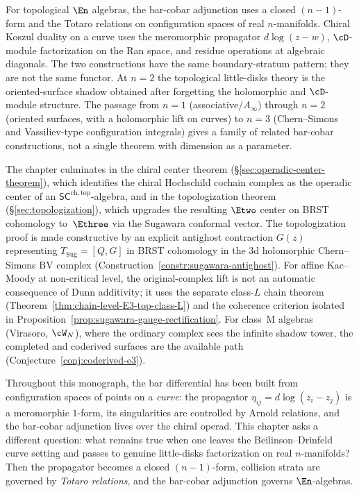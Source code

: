 For topological $\En$ algebras, the bar-cobar adjunction uses a
closed $(n{-}1)$-form and the Totaro relations on
configuration spaces of real $n$-manifolds. Chiral Koszul duality on
a curve uses the meromorphic propagator $d\log(z-w)$, $\cD$-module
factorization on the Ran space, and residue operations at algebraic
diagonals. The two constructions have the same boundary-stratum
pattern; they are not the same functor. At $n = 2$ the topological
little-disks theory is the oriented-surface shadow obtained after
forgetting the holomorphic and $\cD$-module structure. The passage
from $n = 1$ (associative/$A_\infty$) through $n = 2$
(oriented surfaces, with a holomorphic lift on curves) to $n = 3$
(Chern--Simons and Vassiliev-type configuration integrals) gives a
family of related bar-cobar constructions, not a single theorem
with dimension as a parameter.

The chapter culminates in the chiral center theorem
(\S\ref{sec:operadic-center-theorem}), which identifies the chiral
Hochschild cochain complex as the operadic center of an
$\mathsf{SC}^{\mathrm{ch,top}}$-algebra, and in the topologization
theorem (\S\ref{sec:topologization}), which upgrades the resulting
$\Etwo$ center on BRST cohomology to~$\Ethree$ via the Sugawara
conformal vector.
The topologization proof is made constructive by an explicit
antighost contraction $G(z)$ representing
$T_{\mathrm{Sug}} = [Q, G]$ in BRST cohomology
in the $3$d holomorphic Chern--Simons BV complex
(Construction~\ref{constr:sugawara-antighost}). For affine
Kac--Moody at non-critical level, the original-complex lift is
not an automatic consequence of Dunn additivity; it uses the
separate class-$L$ chain theorem
(Theorem~\ref{thm:chain-level-E3-top-class-L}) and the coherence
criterion isolated in
Proposition~\ref{prop:sugawara-gauge-rectification}. For
class~M algebras (Virasoro, $\cW_N$), where the ordinary complex
sees the infinite shadow tower, the completed and coderived
surfaces are the available path
(Conjecture~\ref{conj:coderived-e3}).

Throughout this monograph, the bar differential has been built from
configuration spaces of points on a \emph{curve}: the propagator
$\eta_{ij} = d\log(z_i - z_j)$ is a meromorphic $1$-form, its
singularities are controlled by Arnold relations, and the bar-cobar
adjunction lives over the chiral operad. This chapter asks a
different question: what remains true when one leaves the
Beilinson--Drinfeld curve setting and passes to genuine little-disks
factorization on real $n$-manifolds? Then the propagator becomes a
closed $(n-1)$-form, collision strata are governed by
\emph{Totaro relations}, and the bar-cobar adjunction governs
$\En$-algebras.

